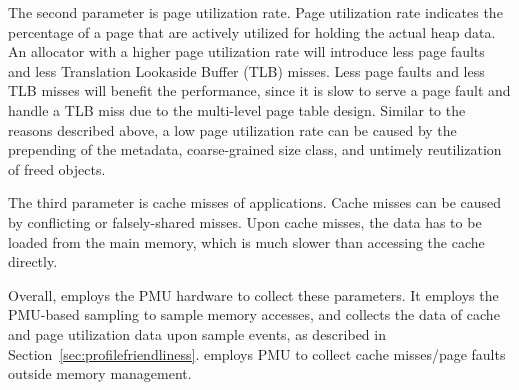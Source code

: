 
The second parameter is page utilization rate. Page utilization rate indicates the percentage of a page that are actively utilized for holding the actual heap data. An allocator with a higher page utilization rate will introduce less page faults and less Translation Lookaside Buffer (TLB) misses. Less page faults and less TLB misses will benefit the performance, since it is  slow to serve a page fault and handle a TLB miss due to the multi-level page table design. Similar to the reasons described above, a low page utilization rate can be caused by the prepending of the metadata, coarse-grained size class, and untimely reutilization of freed objects. 

The third parameter is cache misses of applications. Cache misses can be caused by conflicting or falsely-shared misses. Upon cache misses, the data has to be loaded from the main memory, which is much slower than accessing the cache directly. 

Overall, \MP{} employs the PMU hardware to collect these parameters. It employs the PMU-based sampling to sample memory accesses, and collects the data of cache and page utilization data upon sample events, as described in Section~\ref{sec:profilefriendliness}. \MP{} employs PMU to collect cache misses/page faults outside memory management.




